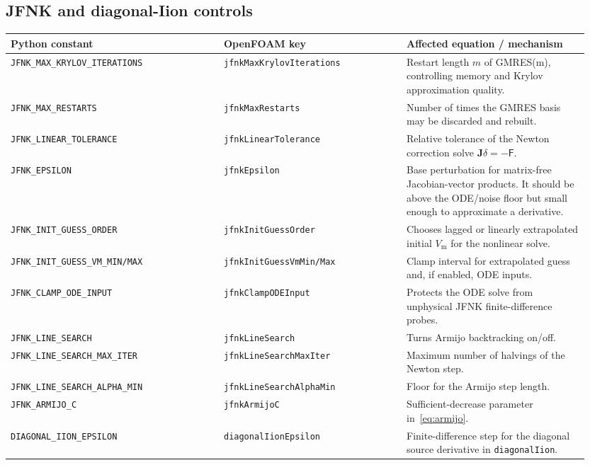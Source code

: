 \documentclass[11pt,a4paper]{article}
\newcommand{\code}[1]{\texttt{\small #1}}
\newcommand{\Vm}{V_{\text{m}}}
\newcommand{\Fres}{\mathsf{F}}
\begin{document}
\subsection{JFNK and diagonal-Iion controls}
\begin{longtable}{@{}p{0.35\linewidth}p{0.30\linewidth}p{0.30\linewidth}@{}}
\toprule
Python constant & OpenFOAM key & Affected equation / mechanism \\
\midrule \endhead
\code{JFNK\_MAX\_KRYLOV\_ITERATIONS} & \code{jfnkMaxKrylovIterations} &
   Restart length $m$ of GMRES(m), controlling memory and Krylov
   approximation quality. \\
\code{JFNK\_MAX\_RESTARTS} & \code{jfnkMaxRestarts} &
   Number of times the GMRES basis may be discarded and rebuilt. \\
\code{JFNK\_LINEAR\_TOLERANCE} & \code{jfnkLinearTolerance} &
   Relative tolerance of the Newton correction solve
   $\mathbf{J}\delta=-\Fres$. \\
\code{JFNK\_EPSILON} & \code{jfnkEpsilon} &
   Base perturbation for matrix-free Jacobian-vector products. It should
   be above the ODE/noise floor but small enough to approximate a
   derivative. \\
\code{JFNK\_INIT\_GUESS\_ORDER} & \code{jfnkInitGuessOrder} &
   Chooses lagged or linearly extrapolated initial $\Vm$ for the
   nonlinear solve. \\
\code{JFNK\_INIT\_GUESS\_VM\_MIN/MAX} &
   \code{jfnkInitGuessVmMin/Max} &
   Clamp interval for extrapolated guess and, if enabled, ODE inputs. \\
\code{JFNK\_CLAMP\_ODE\_INPUT} & \code{jfnkClampODEInput} &
   Protects the ODE solve from unphysical JFNK finite-difference probes. \\
\code{JFNK\_LINE\_SEARCH} & \code{jfnkLineSearch} &
   Turns Armijo backtracking on/off. \\
\code{JFNK\_LINE\_SEARCH\_MAX\_ITER} &
   \code{jfnkLineSearchMaxIter} &
   Maximum number of halvings of the Newton step. \\
\code{JFNK\_LINE\_SEARCH\_ALPHA\_MIN} &
   \code{jfnkLineSearchAlphaMin} &
   Floor for the Armijo step length. \\
\code{JFNK\_ARMIJO\_C} & \code{jfnkArmijoC} &
   Sufficient-decrease parameter in~\eqref{eq:armijo}. \\
\code{DIAGONAL\_IION\_EPSILON} & \code{diagonalIionEpsilon} &
   Finite-difference step for the diagonal source derivative in
   \code{diagonalIion}. \\
\bottomrule
\end{longtable}
\end{document}
